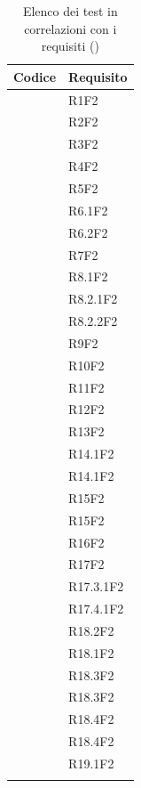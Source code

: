 	\setcounter{tableCounter}{1}
	\begin{table}[H]
		\centering
		{\def\arraystretch{1.4}
		\begin{tabularx}{0.7\textwidth}{YY}
			\textbf{Codice} & \textbf{Requisito} \\
			\toprule
			\addtots & R1F2 \\
			\addtots & R2F2 \\
			\addtots & R3F2 \\
			\addtots & R4F2 \\
			\addtots & R5F2 \\
			\addtots & R6.1F2 \\
			\addtots & R6.2F2 \\
			\addtots & R7F2 \\
			\addtots & R8.1F2 \\
			\addtots & R8.2.1F2 \\
			\addtots & R8.2.2F2 \\
			\addtots & R9F2 \\
			\addtots & R10F2 \\
			\addtots & R11F2 \\
			\addtots & R12F2 \\
			\addtots & R13F2 \\
			\addtots & R14.1F2 \\			
			\addtots & R14.1F2 \\
			\addtots & R15F2 \\
			\addtots & R15F2 \\
			\addtots & R16F2 \\
			\addtots & R17F2 \\
			\addtots & R17.3.1F2 \\
			\addtots & R17.4.1F2 \\
			\addtots & R18.2F2 \\
			\addtots & R18.1F2 \\
			\addtots & R18.3F2 \\
			\addtots & R18.3F2 \\
			\addtots & R18.4F2 \\
			\addtots & R18.4F2 \\
			\addtots & R19.1F2 \\
            \bottomrule\\
			\end{tabularx}}
		\caption{Elenco dei test in correlazioni con i requisiti (\thetableCounter)}
	\end{table}
	
